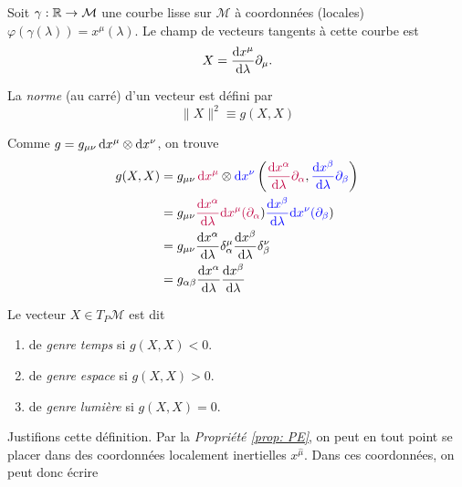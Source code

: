 Soit $\gamma: \mathbb{R} \to \mathcal{M}$ une courbe lisse sur $\mathcal{M}$ à coordonnées (locales) $\varphi(\gamma(\lambda)) = x^{\mu}(\lambda)$. Le champ de vecteurs tangents à cette courbe est
\begin{equation}
X = \frac{\mathrm{d} x^{\mu}}{\mathrm{d} \lambda}\partial_{\mu}.
\end{equation}
\begin{theoremframe}
    \begin{defi}
        La \emph{norme} (au carré) d'un vecteur est défini par
        \begin{equation}
            \lVert X \rVert^2 \equiv g(X,X) 
        \end{equation}
    \end{defi}
\end{theoremframe}
Comme $g = g_{\mu \nu}\,\mathrm{d} x^{\mu}\otimes \mathrm{d} x^{\nu}$, on trouve
\begin{align}
    g(X, X) &= g_{\mu \nu}\,\textcolor{purple}{\mathrm{d} x^{\mu}}\otimes \textcolor{blue}{\mathrm{d} x^{\nu}}\left(\textcolor{purple}{\frac{\mathrm{d} x^{\alpha}}{\mathrm{d} \lambda} \partial_{\alpha}}, \textcolor{blue}{\frac{\mathrm{d} x^{\beta}}{\mathrm{d} \lambda} \partial_{\beta}}\right)\\
    &= g_{\mu \nu}\textcolor{purple}{\frac{\mathrm{d} x^{\alpha}}{\mathrm{d} \lambda} \mathrm{d} x^{\mu}(\partial_{\alpha}})\textcolor{blue}{\frac{\mathrm{d} x^{\beta}}{\mathrm{d} \lambda} \mathrm{d} x^{\nu}(\partial_{\beta}})\\
    &= g_{\mu \nu}\frac{\mathrm{d} x^{\alpha}}{\mathrm{d} \lambda}\delta^{\mu}_{\alpha}\frac{\mathrm{d} x^{\beta}}{\mathrm{d} \lambda}\delta^{\nu}_{\beta}\\
    &= g_{\alpha \beta}\frac{\mathrm{d} x^{\alpha}}{\mathrm{d} \lambda}\frac{\mathrm{d} x^{\beta}}{\mathrm{d} \lambda}
\end{align}
\begin{theoremframe}
    \begin{defi}
        Le vecteur $X \in T_P\mathcal{M}$ est dit
        \begin{enumerate}[label = \roman*.]
            \item de \emph{genre temps} si $g(X,X) < 0$.
            \item de \emph{genre espace} si $g(X,X) > 0$.
            \item de \emph{genre lumière} si $g(X,X) = 0$.
        \end{enumerate}
    \end{defi}
\end{theoremframe}
Justifions cette définition. Par la \textit{Propriété \ref{prop: PE}}, on peut en tout point se placer dans des coordonnées localement inertielles $x^{\hat{\mu}}$. Dans ces coordonnées, on peut donc écrire
